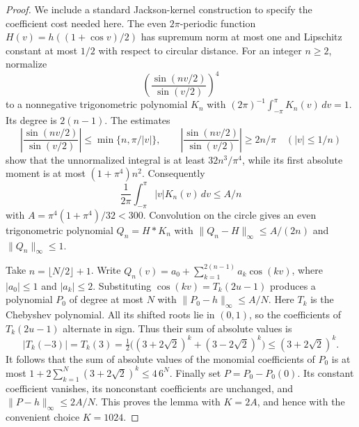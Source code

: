 \documentclass[11pt,letterpaper]{article}
\theoremstyle{definition}
\theoremstyle{remark}
\newcommand{\1}{\mathbf 1}
\begin{document}
\begin{proof}
We include a standard Jackson-kernel construction to specify the coefficient
cost needed here.  The even $2\pi$-periodic function
$H(v)=h((1+\cos v)/2)$ has supremum norm at most one and Lipschitz constant
at most $1/2$ with respect to circular distance.  For an integer $n\geq2$,
normalize
\[
 \left(\frac{\sin(nv/2)}{\sin(v/2)}\right)^4
\]
to a nonnegative trigonometric polynomial $K_n$ with
$(2\pi)^{-1}\int_{-\pi}^{\pi}K_n(v)\,dv=1$.
Its degree is $2(n-1)$.  The estimates
\[
 \left|\frac{\sin(nv/2)}{\sin(v/2)}\right|
 \leq\min\{n,\pi/|v|\},\qquad
 \left|\frac{\sin(nv/2)}{\sin(v/2)}\right|
 \geq2n/\pi\quad(|v|\leq1/n)
\]
show that the unnormalized integral is at least $32n^3/\pi^4$,
while its first absolute moment is at most $(1+\pi^4)n^2$.
Consequently
\[
 \frac1{2\pi}\int_{-\pi}^{\pi}|v|K_n(v)\,dv\leq A/n
\]
with $A=\pi^4(1+\pi^4)/32<300$. Convolution on the circle gives an even trigonometric
polynomial $Q_n=H*K_n$ with
$\|Q_n-H\|_\infty\leq A/(2n)$ and $\|Q_n\|_\infty\leq1$.

Take $n=\lfloor N/2\rfloor+1$.  Write
$Q_n(v)=a_0+\sum_{k=1}^{2(n-1)}a_k\cos(kv)$, where
$|a_0|\leq1$ and $|a_k|\leq2$.  Substituting
$\cos(kv)=T_k(2u-1)$ produces a polynomial $P_0$ of degree at most $N$
with $\|P_0-h\|_\infty\leq A/N$.  Here $T_k$ is the Chebyshev
polynomial.  All its shifted roots lie in $(0,1)$, so the coefficients of
$T_k(2u-1)$ alternate in sign.  Thus their sum of absolute values is
\[
 |T_k(-3)|=T_k(3)
 =\tfrac12\big((3+2\sqrt2)^k+(3-2\sqrt2)^k\big)
 \leq(3+2\sqrt2)^k.
\]
It follows that the sum of absolute values of the monomial coefficients of
$P_0$ is at most
$1+2\sum_{k=1}^N(3+2\sqrt2)^k\leq4\,6^N$.
Finally set $P=P_0-P_0(0)$.  Its constant coefficient vanishes, its
nonconstant coefficients are unchanged, and
$\|P-h\|_\infty\leq2A/N$. This proves the lemma with $K=2A$,
and hence with the convenient choice $K=1024$.
\end{proof}
\end{document}
